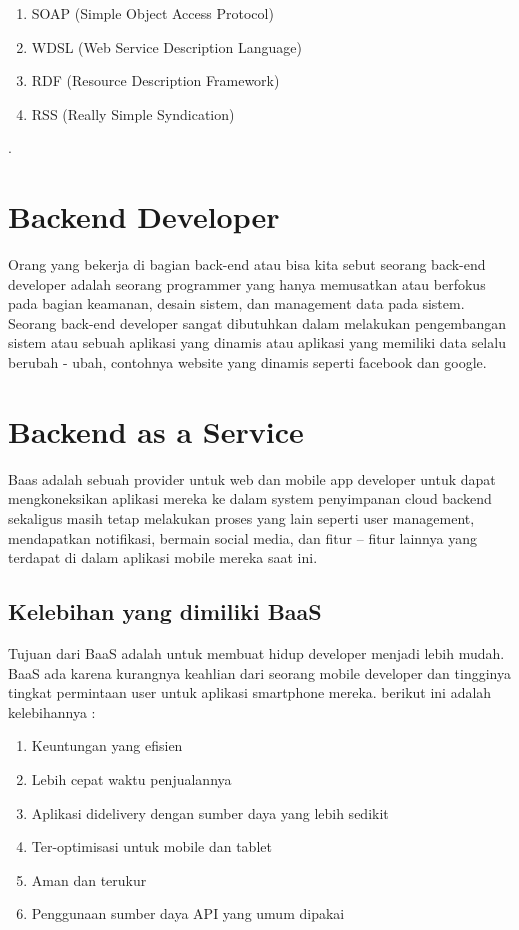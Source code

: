 \begin{enumerate}
\item SOAP (Simple Object Access Protocol)
\item WDSL (Web Service Description Language)
\item RDF (Resource Description Framework)
\item RSS (Really Simple Syndication)
\end {enumerate}
\cite{curbera2001web}.


\section{Backend Developer}
	Orang yang bekerja di bagian back-end atau bisa kita sebut seorang back-end developer adalah seorang programmer yang hanya
memusatkan atau berfokus pada bagian keamanan, desain sistem, dan management data pada sistem. Seorang back-end developer
sangat dibutuhkan dalam melakukan pengembangan sistem atau sebuah aplikasi yang dinamis atau aplikasi yang memiliki data selalu
berubah - ubah, contohnya website yang dinamis seperti facebook dan google.

\section{Backend as a Service}
	Baas adalah sebuah provider untuk web dan mobile app developer untuk dapat mengkoneksikan 
aplikasi mereka ke dalam system penyimpanan cloud backend sekaligus masih tetap melakukan proses yang lain seperti user management, 
mendapatkan notifikasi, bermain social media, dan fitur – fitur lainnya yang terdapat di dalam aplikasi mobile mereka saat ini.

\subsection{Kelebihan yang dimiliki BaaS}
	Tujuan dari BaaS adalah untuk membuat hidup developer menjadi 
lebih mudah. BaaS ada karena kurangnya keahlian dari seorang 
mobile developer dan tingginya tingkat permintaan user untuk 
aplikasi smartphone mereka. berikut ini adalah kelebihannya :

\begin{enumerate}
\item Keuntungan yang efisien
\item Lebih cepat waktu penjualannya
\item Aplikasi didelivery dengan sumber daya yang lebih sedikit
\item Ter-optimisasi untuk mobile dan tablet
\item Aman dan terukur
\item Penggunaan sumber daya API yang umum dipakai
\end{enumerate}

